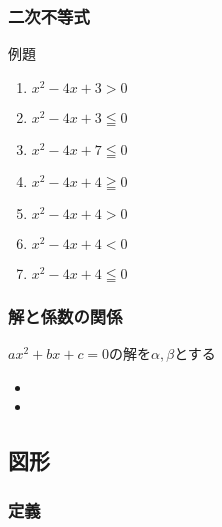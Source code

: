 \documentclass[10pt,dvipdfmx]{jsarticle}
\begin{document}
\subsubsection*{二次不等式}
\begin{itembox}[l]{例題}
  \begin{large}
    \begin{multicols}{2}
      \begin{enumerate}
        \item $x^2-4x+3>0$
        \item $x^2-4x+3\leqq0$
        \item $x^2-4x+7\leqq0$
        \item $x^2-4x+4\geqq0$
        \item $x^2-4x+4>0$
        \item  $x^2-4x+4<0$
        \item $x^2-4x+4\leqq0$
      \end{enumerate}
    \end{multicols}
  \end{large}

\end{itembox}

\subsubsection*{解と係数の関係}
$ax^2+bx+c=0$の解を$\alpha,\beta$とする
\begin{multicols}{2}
  \begin{itemize}
    \item \item
  \end{itemize}
\end{multicols}


\newpage
\subsection*{図形}
\subsubsection*{定義}
\begin{minipage}[t]{0.5\textwidth}
\end{minipage}
\end{document}
